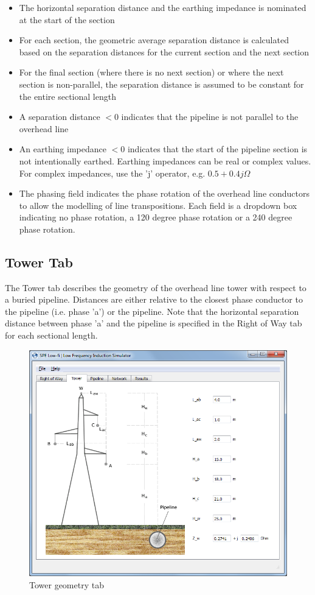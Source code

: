\documentclass{article}
\begin{document}
\begin{itemize}
\item The horizontal separation distance and the earthing impedance is nominated at the start of the section
\item For each section, the geometric average separation distance is calculated based on the separation distances for the current section and the next section
\item For the final section (where there is no next section) or where the next section is non-parallel, the separation distance is assumed to be constant for the entire sectional length
\item A separation distance $<$0 indicates that the pipeline is not parallel to the overhead line
\item An earthing impedance $<$0 indicates that the start of the pipeline section is not intentionally earthed. Earthing impedances can be real or complex values. For complex impedances, use the 'j' operator, e.g. $0.5 + 0.4j \Omega$
\item The phasing field indicates the phase rotation of the overhead line conductors to allow the modelling of line transpositions. Each field is a dropdown box indicating no phase rotation, a 120 degree phase rotation or a 240 degree phase rotation. 
\end{itemize}

\subsection{Tower Tab}
The Tower tab describes the geometry of the overhead line tower with respect to a buried pipeline. Distances are either relative to the closest phase conductor to the pipeline (i.e. phase 'a') or the pipeline. Note that the horizontal separation distance between phase 'a' and the pipeline is specified in the Right of Way tab for each sectional length.

\begin{figure}[!htp]
\begin{center}
\caption{Tower geometry tab}
\label{fig:tower}
\includegraphics[width=0.9\linewidth]{./Figures/tower_geometry.png}
\end{center}
\end{figure}
\end{document}

